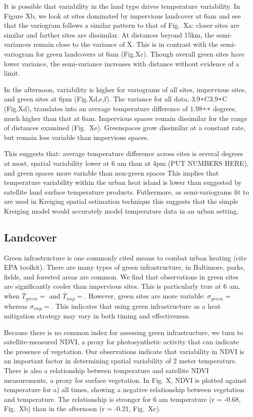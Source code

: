 \documentclass[draft,linenumbers]{agujournal}
\begin{document}
It is possible that variability in the land type drives temperature variability. In Figure Xb, we look at sites dominated by impervious landcover at 6am and see that the variogram follows a similar pattern to that of Fig.~Xa: closer sites are similar and farther sites are dissimilar. At distances beyond 15km, the semi-variances remain close to the variance of X. This is in contrast with the semi-variogram for green landcovers at 6am (Fig.Xc). Though overall green sites have lower variance, the semi-variance increases with distance without evidence of a limit.

In the afternoon, variability is higher for variograms of all sites, impervious sites, and green sites at 6pm (Fig.Xd,e,f). The variance for all data, 3.9∘C3.9∘C (Fig.Xd), translates into an average temperature difference of 1.98∘∘ degrees, much higher than that at 6am. Impervious spaces remain dissimilar for the range of distances examined (Fig.~Xe). Greenspaces grow dissimilar at a constant rate, but remain less variable than impervious spaces.

This suggests that: average temperature difference across sites is several degrees at most, spatial variability lower at 6 am than at 4pm (PUT NUMBERS HERE), and green spaces more variable than non-green spaces This implies that temperature variability within the urban heat island is lower than suggested by satellite land surface temperature products. Futhermore, as semi-variograms fit to are used in Kreiging spatial estimation technique this suggests that the simple Kreiging model would accurately model temperature data in an urban setting.

\subsection{Landcover}
Green infrastructure is one commonly cited means to combat urban heating (cite EPA toolkit). There are many types of green infrastructure, in Baltimore, parks, fields, and forested areas are common. We find that 
observations in green sites are significantly cooler than impervious sites. This is particularly true at 6 am, when $\overline{T}_{green} = $ and $\overline{T}_{imp} = $.
However, green sites are more variable: $\sigma_{green} = $ whereas $\sigma_{imp} = $. This indicates that using green infrastructure as a heat mitigation strategy may vary in both timing and effectiveness. 

Because there is no common index for assessing green infrastructure, we turn to satellite-measured NDVI, a proxy for photosynthetic activity that can indicate the presence of vegetation. Our observations indicate that variability in NDVI is an important factor in determining spatial variability of 2 meter temperature. 
There is also a relationship between temperature and satellite NDVI measurements, a proxy for surface vegetation. In Fig. X, NDVI is plotted against temperature for a) all times, showing a negative relationship between vegetation and temperature. The relationship is stronger for 6 am temperature (r = -0.68, Fig.~Xb) than in the afternoon (r = -0.21, Fig.~Xc). 
\end{document}

